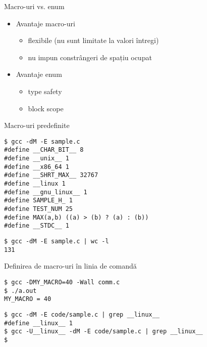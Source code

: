 \documentclass{beamer}
\begin{document}
\begin{frame}{Macro-uri vs. enum}
	\begin{itemize}
		\item Avantaje macro-uri
			\begin{itemize}
				\item flexibile (nu sunt limitate la valori întregi)
				\item nu impun constrângeri de spațiu ocupat
			\end{itemize}
		\item Avantaje enum
			\begin{itemize}
				\item type safety
				\item block scope
			\end{itemize}
	\end{itemize}
\end{frame}

\begin{frame}{Macro-uri predefinite}
	\begin{beamerboxesrounded}[lower=block body,shadow=true]{}
\texttt{\$ gcc -dM -E sample.c \\
\#define \_\_CHAR\_BIT\_\_ 8 \\
\#define \_\_unix\_\_ 1 \\
\#define \_\_x86\_64 1 \\
\#define \_\_SHRT\_MAX\_\_ 32767 \\
\#define \_\_linux 1 \\
\#define \_\_gnu\_linux\_\_ 1 \\
\#define SAMPLE\_H\_ 1 \\
\#define TEST\_NUM 25 \\
\#define MAX(a,b) ((a) > (b) ? (a) : (b)) \\
\#define \_\_STDC\_\_ 1
		}
	\end{beamerboxesrounded}
	\begin{beamerboxesrounded}[lower=block body,shadow=true]{}
\texttt{\$ gcc -dM -E sample.c | wc -l \\
131
}
	\end{beamerboxesrounded}
\end{frame}

\begin{frame}{Definirea de macro-uri în linia de comandă}
	\begin{beamerboxesrounded}[lower=block body,shadow=true]{}
		 \texttt{\$ gcc -DMY\_MACRO=40 -Wall comm.c \\
\$ ./a.out \\
MY\_MACRO = 40
		}
	\end{beamerboxesrounded}
	\begin{beamerboxesrounded}[lower=block body,shadow=true]{}
		\texttt{\$ gcc -dM -E code/sample.c | grep \_\_linux\_\_ \\
\#define \_\_linux\_\_ 1 \\
\$ gcc -U\_\_linux\_\_ -dM -E code/sample.c | grep \_\_linux\_\_ \\
\$
		}
	\end{beamerboxesrounded}
\end{frame}
\end{document}
